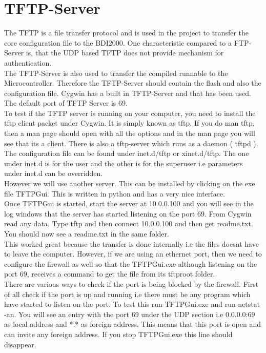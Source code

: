 \section{TFTP-Server} 
The \ac{TFTP} is a file transfer protocol and is used in the project to transfer the core configuration file to the BDI2000. One characteristic compared to a FTP-Server is, that the \ac{UDP} based \ac{TFTP} does not provide mechanism for authentication.\cite{TFTPWIKI}\\
The \ac{TFTP}-Server is also used to transfer the compiled runnable to the Microcontroller. Therefore the \ac{TFTP}-Server should contain the flash and also the configuration file. Cygwin has a built in \ac{TFTP}-Server and that has been used. The default port of TFTP Server is 69.\\
To test if the TFTP server is running on your computer, you need to install the tftp client packet under Cygwin. It is simply known as tftp. If you do man tftp, then a man page should open with all the options and in the man page you will see that its a client.
There is also a tftp-server which runs as a daemon ( tftpd ). The configuration file can be found under inet.d/tftp or xinet.d/tftp. The one under inet.d is for the user and the other is for the superuser i.e parameters under inet.d can be overridden.\\
However we will use another server. This can be installed by clicking on the exe file TFTPGui. This is written in python and has a very nice interface. \\
Once TFTPGui is started, start the server at 10.0.0.100 and you will see in the log windows that the server has started listening on the port 69. From Cygwin read any data. Type tftp and then connect 10.0.0.100 and then get readme.txt. You should now see a readme.txt in the same folder.\\
This worked great because the transfer is done internally i.e the files doesnt have to leave the computer. However, if we are using an ethernet port, then we need to configure the firewall as well so that the TFTPGui.exe although listening on the port 69, receives a command to get the file from its tftproot folder.\\
There are various ways to check if the port is being blocked by the firewall. First of all check if the port is up and running i.e there must be any program which have started to listen on the port. To test this run TFTPGui.exe and run netstat -an. You will see an entry with the port 69 under the UDP section i.e 0.0.0.0:69 as local address and *.* as foreign address. This means that this port is open and can invite any foreign address. If you stop TFTPGui.exe this line should disappear.\\
